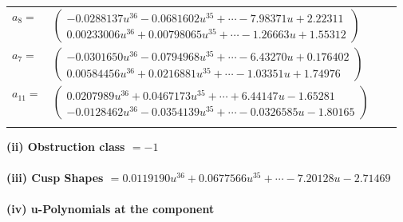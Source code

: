 \documentclass[1p]{elsarticle_modified}
\theoremstyle{definition}
\begin{document}
\begin{tabular}{m{7pt} m{180pt} m{7pt} m{180pt} }
\flushright $a_{8}=$&$\begin{pmatrix}-0.0288137 u^{36}-0.0681602 u^{35}+\cdots-7.98371 u+2.22311\\0.00233006 u^{36}+0.00798065 u^{35}+\cdots-1.26663 u+1.55312\end{pmatrix}$ \\
\flushright $a_{7}=$&$\begin{pmatrix}-0.0301650 u^{36}-0.0794968 u^{35}+\cdots-6.43270 u+0.176402\\0.00584456 u^{36}+0.0216881 u^{35}+\cdots-1.03351 u+1.74976\end{pmatrix}$ \\
\flushright $a_{11}=$&$\begin{pmatrix}0.0207989 u^{36}+0.0467173 u^{35}+\cdots+6.44147 u-1.65281\\-0.0128462 u^{36}-0.0354139 u^{35}+\cdots-0.0326585 u-1.80165\end{pmatrix}$\\&\end{tabular}
\flushleft \textbf{(ii) Obstruction class $= -1$}\\~\\
\flushleft \textbf{(iii) Cusp Shapes $= 0.0119190 u^{36}+0.0677566 u^{35}+\cdots-7.20128 u-2.71469$}\\~\\
\newpage\renewcommand{\arraystretch}{1}
\flushleft \textbf{(iv) u-Polynomials at the component}\newline \\
\end{document}
